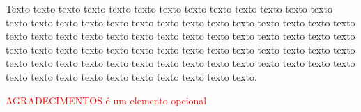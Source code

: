 \begin{agradecimentos}

Texto texto texto texto texto texto texto texto texto texto texto texto texto texto texto texto texto texto texto texto texto texto texto texto texto texto texto texto texto texto texto texto texto texto texto texto texto texto texto texto texto texto texto texto texto texto texto texto texto texto texto texto texto texto texto texto texto texto texto texto texto texto texto texto texto texto texto texto texto texto texto texto texto texto texto texto texto texto texto.

\textcolor{red}{AGRADECIMENTOS é um elemento opcional}


\end{agradecimentos}